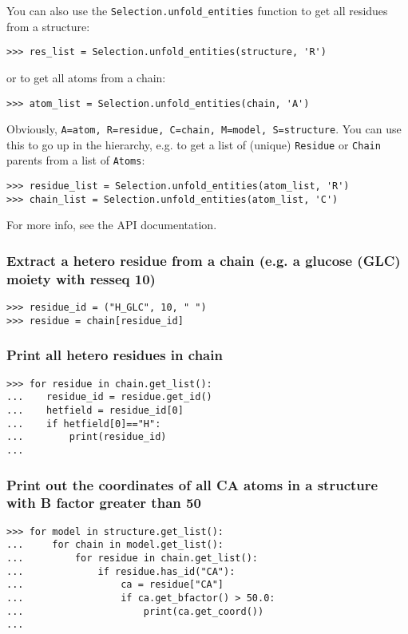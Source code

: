 You can also use the \verb+Selection.unfold_entities+ function to get all residues from a structure:
\begin{verbatim}
>>> res_list = Selection.unfold_entities(structure, 'R')
\end{verbatim}
or to get all atoms from a chain:
\begin{verbatim}
>>> atom_list = Selection.unfold_entities(chain, 'A')
\end{verbatim}
Obviously, \verb+A=atom, R=residue, C=chain, M=model, S=structure+.
You can use this to go up in the hierarchy, e.g. to get a list of
(unique) \verb+Residue+ or \verb+Chain+ parents from a list of
\verb+Atoms+:

\begin{verbatim}
>>> residue_list = Selection.unfold_entities(atom_list, 'R')
>>> chain_list = Selection.unfold_entities(atom_list, 'C')
\end{verbatim}
For more info, see the API documentation.

\subsubsection*{Extract a hetero residue from a chain (e.g. a glucose (GLC) moiety with resseq 10)}

\begin{verbatim}
>>> residue_id = ("H_GLC", 10, " ")
>>> residue = chain[residue_id]
\end{verbatim}

\subsubsection*{Print all hetero residues in chain}

\begin{verbatim}
>>> for residue in chain.get_list():
...    residue_id = residue.get_id()
...    hetfield = residue_id[0]
...    if hetfield[0]=="H":
...        print(residue_id)
...
\end{verbatim}

\subsubsection*{Print out the coordinates of all CA atoms in a structure with B factor greater than 50}

\begin{verbatim}
>>> for model in structure.get_list():
...     for chain in model.get_list():
...         for residue in chain.get_list():
...             if residue.has_id("CA"):
...                 ca = residue["CA"]
...                 if ca.get_bfactor() > 50.0:
...                     print(ca.get_coord())
...
\end{verbatim}

